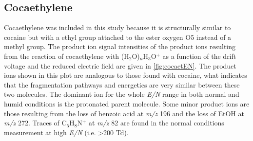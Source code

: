 

\subsection{Cocaethylene}
Cocaethylene was included in this study because it is structurally similar to cocaine but with a ethyl group attached to the ester oxygen O5 instead of a methyl group.
%
The product ion signal intensities of the product ions resulting from the reaction of cocaethylene with (H$_2$O)$_n$H$_3$O$^+$ as a function of the drift voltage and the reduced electric field are given in \autoref{fig:cocaetEN}.
%
The product ions shown in this plot are analogous to those found with cocaine, what indicates that the fragmentation pathways and energetics are very similar between these two molecules.
%
The dominant ion for the whole \textit{E/N} range in both normal and humid conditions is the protonated parent molecule.
%
Some minor product ions are those resulting from 
the loss of benzoic acid at \textit{m/z} 196 and 
the loss of EtOH at \textit{m/z} 272.
%
Traces of C$_5$H$_8$N$^+$ at \textit{m/z} 82 are found in the normal conditions measurement at high \textit{E/N} (i.e. >200 Td).

